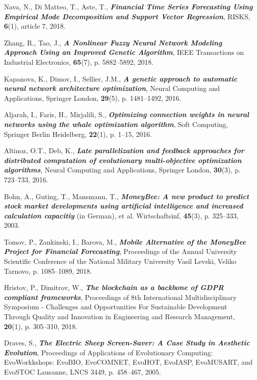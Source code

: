 \documentclass[11pt]{article}
\begin{document}
\begin{thebibliography}{99}

 Nava, N., Di Matteo, T., Aste, T., \textbf{\textit{Financial Time Series Forecasting Using Empirical Mode Decomposition and Support Vector Regression}}, RISKS, \textbf{6}(1), article 7, 2018.

 Zhang, R., Tao, J., \textbf{\textit{A Nonlinear Fuzzy Neural Network Modeling Approach Using an Improved Genetic Algorithm}}, IEEE Transactions on Industrial Electronics, \textbf{65}(7), p. 5882--5892, 2018.

 Kapanova, K., Dimov, I., Sellier, J.M., \textbf{\textit{A genetic approach to automatic neural network architecture optimization}}, Neural Computing and Applications, Springer London, \textbf{29}(5), p. 1481--1492, 2016.

 Aljarah, I., Faris, H., Mirjalili, S., \textbf{\textit{Optimizing connection weights in neural networks using the whale optimization algorithm}}, Soft Computing, Springer Berlin Heidelberg, \textbf{22}(1), p. 1–15, 2016.

 Altinoz, O.T., Deb, K., \textbf{\textit{Late parallelization and feedback approaches for distributed computation of evolutionary multi-objective optimization algorithms}}, Neural Computing and Applications, Springer London, \textbf{30}(3), p. 723--733, 2016.

 Bohn, A., Guting, T., Mansmann, T., \textbf{\textit{MoneyBee: A new product to predict stock market developments using artificial intelligence and increased calculation capacitiy}} (in German), et al. Wirtschaftsinf, \textbf{45}(3), p. 325--333, 2003.

 Tomov, P., Zankinski, I., Barova, M., \textbf{\textit{Mobile Alternative of the MoneyBee Project for Financial Forecasting}}, Proceedings of the Annual University Scientific Conference of the National Military University Vasil Levski, Veliko Tarnovo, p. 1085--1089, 2018.

 Hristov, P., Dimitrov, W., \textbf{\textit{The blockchain as a backbone of GDPR compliant frameworks}}, Proceedings of 8th International Multidisciplinary Symposium - Challenges and Opportunities For Sustainable Development Through Quality and Innovation in Engineering and Research Management, \textbf{20}(1), p. 305--310, 2018.

 Draves, S., \textbf{\textit{The Electric Sheep Screen-Saver: A Case Study in Aesthetic Evolution}}, Proceedings of Applications of Evolutionary Computing: EvoWorkkshops: EvoBIO, EvoCOMNET, EvoHOT, EvoIASP, EvoMUSART, and EvoSTOC Lausanne, LNCS 3449, p. 458--467, 2005.


\end{thebibliography}
\end{document}
